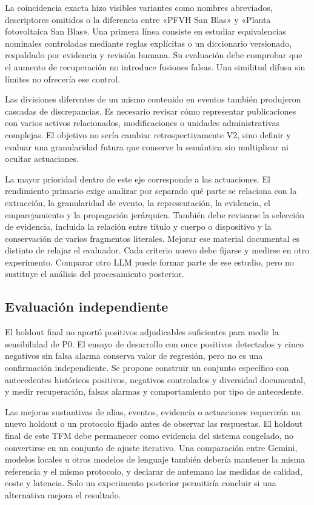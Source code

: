 La coincidencia exacta hizo visibles variantes como nombres abreviados,
descriptores omitidos o la diferencia entre «PFVH San Blas» y «Planta
fotovoltaica San Blas». Una primera línea consiste en estudiar equivalencias
nominales controladas mediante reglas explícitas o un diccionario versionado,
respaldado por evidencia y revisión humana. Su evaluación debe comprobar que
el aumento de recuperación no introduce fusiones falsas. Una similitud difusa
sin límites no ofrecería ese control.

Las divisiones diferentes de un mismo contenido en eventos también produjeron
cascadas de discrepancias. Es necesario revisar cómo representar publicaciones
con varios activos relacionados, modificaciones o unidades administrativas
complejas. El objetivo no sería cambiar retrospectivamente V2, sino definir y
evaluar una granularidad futura que conserve la semántica sin multiplicar ni
ocultar actuaciones.

La mayor prioridad dentro de este eje corresponde a las actuaciones. El
rendimiento primario exige analizar por separado qué parte se relaciona con la
extracción, la granularidad de evento, la representación, la evidencia, el
emparejamiento y la propagación jerárquica. También debe revisarse la selección
de evidencia, incluida la relación entre título y cuerpo o dispositivo y la
conservación de varios fragmentos literales. Mejorar ese material documental
es distinto de relajar el evaluador. Cada criterio nuevo debe fijarse y medirse
en otro experimento. Comparar otro LLM puede formar parte de ese estudio, pero
no sustituye el análisis del procesamiento posterior.

\subsection{Evaluación independiente}

El holdout final no aportó positivos adjudicables suficientes para medir la
sensibilidad de P0. El ensayo de desarrollo con once positivos detectados y
cinco negativos sin falsa alarma conserva valor de regresión, pero no es una
confirmación independiente. Se propone construir un conjunto específico con
antecedentes históricos positivos, negativos controlados y diversidad
documental, y medir recuperación, falsas alarmas y comportamiento por tipo de
antecedente.

Las mejoras sustantivas de alias, eventos, evidencia o actuaciones requerirán
un nuevo holdout o un protocolo fijado antes de observar las respuestas. El
holdout final de este TFM debe permanecer como evidencia del sistema
congelado, no convertirse en un conjunto de ajuste iterativo. Una comparación
entre Gemini, modelos locales u otros modelos de lenguaje también debería
mantener la misma referencia y el mismo protocolo, y declarar de antemano las
medidas de calidad, coste y latencia. Solo un experimento posterior permitiría
concluir si una alternativa mejora el resultado.

